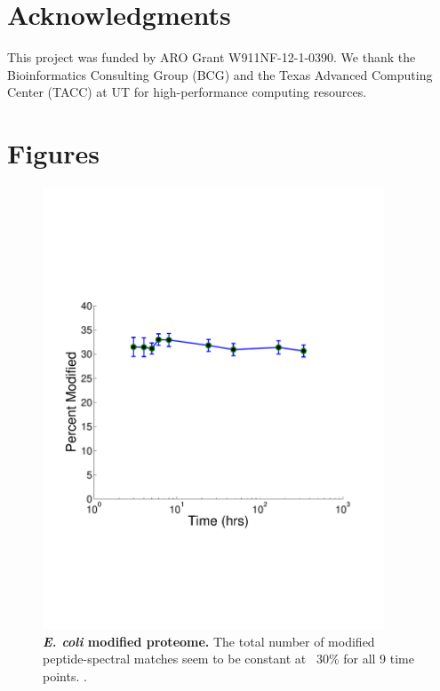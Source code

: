 \documentclass[12pt]{article}
\begin{document}
\section{Acknowledgments}
This project was funded by ARO Grant W911NF-12-1-0390. We thank the Bioinformatics Consulting Group (BCG) and the Texas Advanced Computing Center (TACC) at UT for high-performance computing resources. 




\newpage

\section*{Figures}

\begin{figure}[!ht]
\centerline{\includegraphics[width=4in]{Figures/PTM_modified.pdf}}
\caption{\label{fig:ModifiedPTM}\textbf{\emph{E. coli} modified proteome.} The total number of modified peptide-spectral matches seem to be constant at ~30\% for all 9 time points. .
}
\end{figure}
\end{document}
